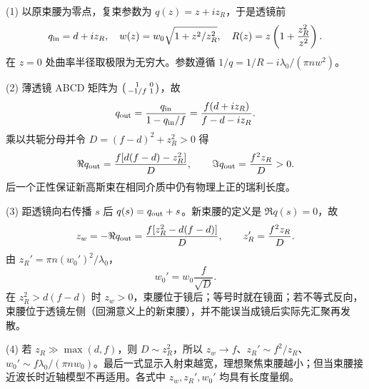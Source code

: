 (1) 以原束腰为零点，复束参数为 \(q(z)=z+iz_R\)，于是透镜前
\[
q_{\rm in}=d+iz_R,\quad w(z)=w_0\sqrt{1+z^2/z_R^2},\quad
R(z)=z\left(1+\frac{z_R^2}{z^2}\right).
\]
在 \(z=0\) 处曲率半径取极限为无穷大。参数遵循 \(1/q=1/R-i\lambda_0/(\pi n w^2)\)。

(2) 薄透镜 ABCD 矩阵为 \(\begin{psmallmatrix}1&0\\-1/f&1\end{psmallmatrix}\)，故
\[
q_{\rm out}=\frac{q_{\rm in}}{1-q_{\rm in}/f}
=\frac{f(d+iz_R)}{f-d-iz_R}.
\]
乘以共轭分母并令 \(D=(f-d)^2+z_R^2>0\) 得
\[
\Re q_{\rm out}=\frac{f[d(f-d)-z_R^2]}D,\qquad
\Im q_{\rm out}=\frac{f^2z_R}D>0.
\]
后一个正性保证新高斯束在相同介质中仍有物理上正的瑞利长度。

(3) 距透镜向右传播 \(s\) 后 \(q(s)=q_{\rm out}+s\)。新束腰的定义是 \(\Re q(s)=0\)，故
\[
z_w=-\Re q_{\rm out}=\frac{f[z_R^2-d(f-d)]}D,\qquad
z_R'=\frac{f^2z_R}D.
\]
由 \(z_R'=\pi n(w_0')^2/\lambda_0\)，
\[
w_0'=w_0\frac{f}{\sqrt D}.
\]
在 \(z_R^2>d(f-d)\) 时 \(z_w>0\)，束腰位于镜后；等号时就在镜面；若不等式反向，束腰位于透镜左侧（回溯意义上的新束腰），并不能误当成镜后实际先汇聚再发散。

(4) 若 \(z_R\gg\max(d,f)\)，则 \(D\sim z_R^2\)，所以 \(z_w\to f\)、\(z_R'\sim f^2/z_R\)、\(w_0'\sim f\lambda_0/(\pi n w_0)\)。最后一式显示入射束越宽，理想聚焦束腰越小；但当束腰接近波长时近轴模型不再适用。各式中 \(z_w,z_R',w_0'\) 均具有长度量纲。
